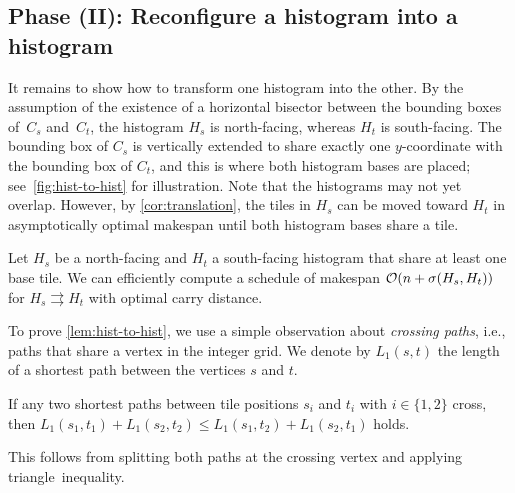 \subsection{Phase (II): Reconfigure a histogram into a histogram}\label{subsec:histogram-to-histogram}
\label{sec:hist-to-hist}

It remains to show how to transform one histogram into the other.
By the assumption of the existence of a horizontal bisector between the bounding boxes of~$C_s$ and~$C_t$, the histogram $H_s$ is north-facing, whereas $H_t$ is south-facing.
The bounding box of $C_s$ is vertically extended to share exactly one $y$-coordinate with the bounding box of $C_t$, and this is where both histogram bases are placed; see~\cref{fig:hist-to-hist} for illustration.
Note that the histograms may not yet overlap.
However, by \cref{cor:translation}, the tiles in $H_s$ can be moved toward $H_t$ in asymptotically optimal makespan until both histogram bases share a tile.

\begin{lemma}
    \label{lem:hist-to-hist}
    Let $H_s$ be a north-facing and $H_t$ a south-facing histogram that share at least one base tile.
    We can efficiently compute a schedule of makespan $\mathcal{O}(n + \sigma(H_s,H_t))$ for $H_s \rightrightarrows H_t$ with optimal carry distance.
\end{lemma}

To prove \cref{lem:hist-to-hist}, we use a simple observation about \emph{crossing paths}, i.e., paths that share a vertex in the integer grid.
We denote by $L_1(s,t)$ the length of a shortest path between the vertices $s$ and $t$.
\begin{observation}
    \label{obs:swapping}
    If any two shortest paths between tile positions $s_i$ and $t_i$ with $i\in \{1,2\}$ cross, then  $L_1(s_1,t_1) + L_1(s_2,t_2) \leq L_1(s_1,t_2) + L_1(s_2,t_1)$ holds.
\end{observation}
This follows from splitting both paths at the crossing vertex and applying triangle~inequality.

